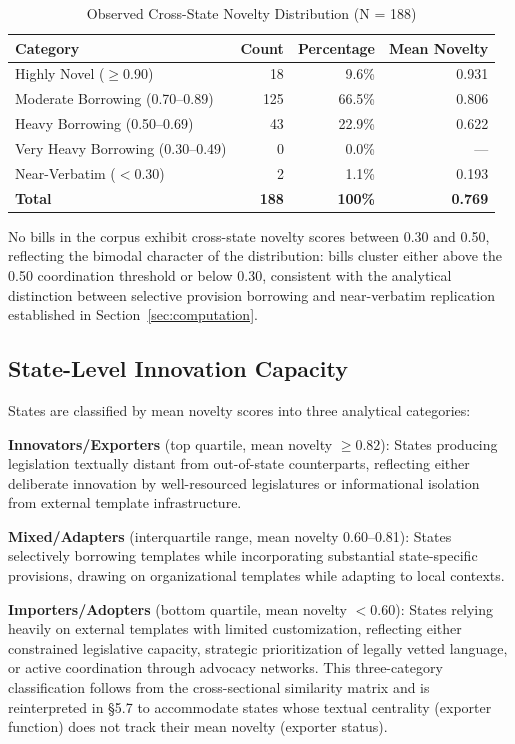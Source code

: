 \begin{table}[h]
\centering
\caption{Observed Cross-State Novelty Distribution (N = 188)}
\label{tab:novelty_distribution}
\begin{tabular}{lrrr}
\toprule
\textbf{Category} & \textbf{Count} & \textbf{Percentage} & \textbf{Mean Novelty} \\
\midrule
Highly Novel ($\geq$0.90)         & 18  & 9.6\%  & 0.931 \\
Moderate Borrowing (0.70--0.89)   & 125 & 66.5\% & 0.806 \\
Heavy Borrowing (0.50--0.69)      & 43  & 22.9\% & 0.622 \\
Very Heavy Borrowing (0.30--0.49) & 0   & 0.0\%  & ---   \\
Near-Verbatim ($<$0.30)           & 2   & 1.1\%  & 0.193 \\
\midrule
\textbf{Total} & \textbf{188} & \textbf{100\%} & \textbf{0.769} \\
\bottomrule
\end{tabular}
\end{table}

No bills in the corpus exhibit cross-state novelty scores between 0.30 and 0.50, reflecting the bimodal character of the distribution: bills cluster either above the 0.50 coordination threshold or below 0.30, consistent with the analytical distinction between selective provision borrowing and near-verbatim replication established in Section~\ref{sec:computation}.

\subsection{State-Level Innovation Capacity}
\label{state-level-inno-cap}
States are classified by mean novelty scores into three analytical categories:

\textbf{Innovators/Exporters} (top quartile, mean novelty $\geq 0.82$): States producing legislation textually distant from out-of-state counterparts, reflecting either deliberate innovation by well-resourced legislatures or informational isolation from external template infrastructure.

\textbf{Mixed/Adapters} (interquartile range, mean novelty 0.60--0.81): States selectively borrowing templates while incorporating substantial state-specific provisions, drawing on organizational templates while adapting to local contexts.

\textbf{Importers/Adopters} (bottom quartile, mean novelty $<0.60$): States relying heavily on external templates with limited customization, reflecting either constrained legislative capacity, strategic prioritization of legally vetted language, or active coordination through advocacy networks.
This three-category classification follows from the cross-sectional similarity matrix and is reinterpreted in §5.7 to accommodate states whose textual centrality (exporter function) does not track their mean novelty (exporter status).


